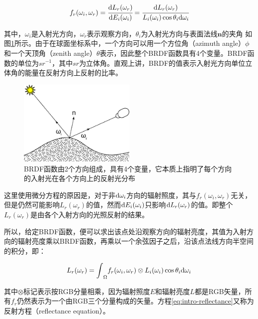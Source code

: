 \begin{equation}\label{eq-intro-brdf}
    f_r(\omega_i,\omega_r)= \cfrac{{\rm d}L_r(\omega_r)}{{\rm d}E_i(\omega_i)}= \cfrac{{\rm d}L_r(\omega_r)}{L_i(\omega_i)\cos\theta_i {\rm d}\omega_i}
\end{equation}

其中，$\omega_i$是入射光方向，$\omega_r$表示观察方向，$\theta_i$为入射光方向与表面法线$\mathbf{n}$的夹角 如图\ref{f:intro-brdf}所示。由于在球面坐标系中，一个方向可以用一个方位角（azimuth angle）$\phi$和一个天顶角（zenith angle）$\theta$表示，因此整个BRDF函数具有4个变量。BRDF函数的单位为$sr^{-1}$，其中$sr$为立体角。直观上讲，BRDF的值表示入射光方向单位立体角的能量在反射方向上反射的比率。

\begin{figure}
\sidecaption
	\includegraphics[width=0.5\textwidth]{figures/intro/BRDF_Diagram}
	\caption{BRDF函数由2个方向组成，具有4个变量，它本质上指明了每个方向的入射光在各个方向上的反射光分布}
	\label{f:intro-brdf}
\end{figure}

这里使用微分方程的原因是，对于非${\rm d}\omega_i$方向的辐射照度，其与$f_r(\omega_i,\omega_r)$无关，但是仍然可能影响$L_r(\omega_r)$的值，然而${\rm d}E_i(\omega_i)$只影响${\rm d}L_r(\omega_r)$的值。即整个$L_r(\omega_r)$是由各个入射方向的光照反射的结果。

所以，给定BRDF函数，便可以求出该点处沿观察方向的辐射亮度，其值为入射方向的辐射亮度乘以BRDF函数，再乘以一个余弦因子之后，沿该点法线方向半空间的积分，即：

\begin{equation}\label{eq:intro-reflectance}
	L_r(\omega_r)={\rm \int}_{\Omega}f_r(\omega_i,\omega_r)\otimes L_i(\omega_i)\cos\theta_i {\rm d}\omega_i
\end{equation}

\noindent 其中$\otimes$标记表示按RGB分量相乘，因为辐射照度$E$和辐射亮度$L$都是RGB矢量，所有$f_r$仍然表示为一个由RGB三个分量构成的矢量。方程\ref{eq:intro-reflectance}又称为反射方程（reflectance equation）。




